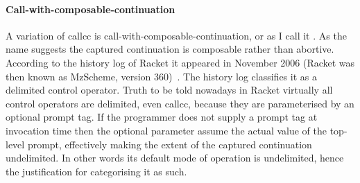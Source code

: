 \documentclass[12pt,phd,lfcs,twoside,openright,logo,leftchapter,normalheadings]{infthesis}
\theoremstyle{plain}
\theoremstyle{definition}
\begin{document}
\paragraph{Call-with-composable-continuation} A variation of callcc is
call-with-composable-continuation, or as I call it \textCallcomc{}.
%
As the name suggests the captured continuation is composable rather
than abortive.
%
According to the history log of Racket it appeared in November 2006
(Racket was then known as MzScheme, version 360)~\cite{Flatt20}. The
history log classifies it as a delimited control operator. Truth to be
told nowadays in Racket virtually all control operators are delimited,
even callcc, because they are parameterised by an optional prompt
tag. If the programmer does not supply a prompt tag at invocation time
then the optional parameter assume the actual value of the top-level
prompt, effectively making the extent of the captured continuation
undelimited.
%
In other words its default mode of operation is undelimited, hence the
justification for categorising it as such.
%
\end{document}
